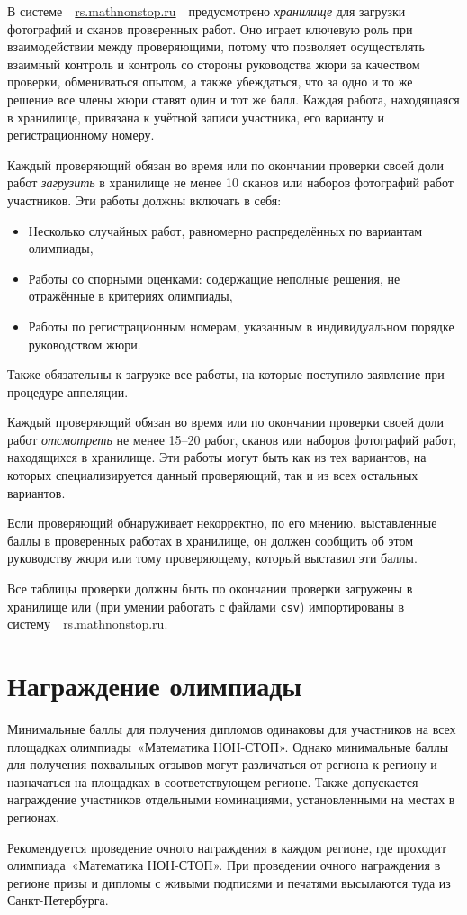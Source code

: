 \documentclass[a4paper,12pt]{article}
\newcommand{\mns}{«Математика НОН-СТОП»\xspace}
\begin{document}
В системе\ \ \url{rs.mathnonstop.ru}\ \ предусмотрено {\it хранилище} для загрузки фотографий и сканов проверенных работ. Оно играет ключевую роль при взаимодействии между проверяющими, потому что позволяет осуществлять взаимный контроль и контроль со стороны руководства жюри за качеством проверки, обмениваться опытом, а также убеждаться, что за одно и то же решение все члены жюри ставят один и тот же балл. Каждая работа, находящаяся в хранилище, привязана к учётной записи участника, его варианту и регистрационному номеру.

Каждый проверяющий обязан во время или по окончании проверки своей доли работ {\it загрузить} в хранилище не менее 10 сканов или наборов фотографий работ участников. Эти работы должны включать в себя: \vspace{-4mm}

\begin{itemize}
	\item Несколько случайных работ, равномерно распределённых по вариантам олимпиады,
	\item Работы со спорными оценками: содержащие неполные решения, не отражённые в критериях олимпиады,
	\item Работы по регистрационным номерам, указанным в индивидуальном порядке руководством жюри.
\end{itemize}

Также обязательны к загрузке все работы, на которые поступило заявление при процедуре аппеляции.

Каждый проверяющий обязан во время или по окончании проверки своей доли работ {\it отсмотреть} не менее 15–20 работ, сканов или наборов фотографий работ, находящихся в хранилище. Эти работы могут быть как из тех вариантов, на которых специализируется данный проверяющий, так и из всех остальных вариантов.

Если проверяющий обнаруживает некорректно, по его мнению, выставленные баллы в проверенных работах в хранилище, он должен сообщить об этом руководству жюри или тому проверяющему, который выставил эти баллы.

Все таблицы проверки должны быть по окончании проверки загружены в хранилище или (при умении работать с файлами {\tt csv}) импортированы в систему\ \ \url{rs.mathnonstop.ru}.

\section{Награждение олимпиады}

Минимальные баллы для получения дипломов одинаковы для участников на всех площадках олимпиады~\mns. Однако минимальные баллы для получения похвальных отзывов могут различаться от региона к региону и назначаться на площадках в соответствующем регионе. Также допускается награждение участников отдельными номинациями, установленными на местах в регионах.

Рекомендуется проведение очного награждения в каждом регионе, где проходит олимпиада~\mns. При проведении очного награждения в регионе призы и дипломы с живыми подписями и печатями высылаются туда из Санкт-Петербурга.
\end{document}
